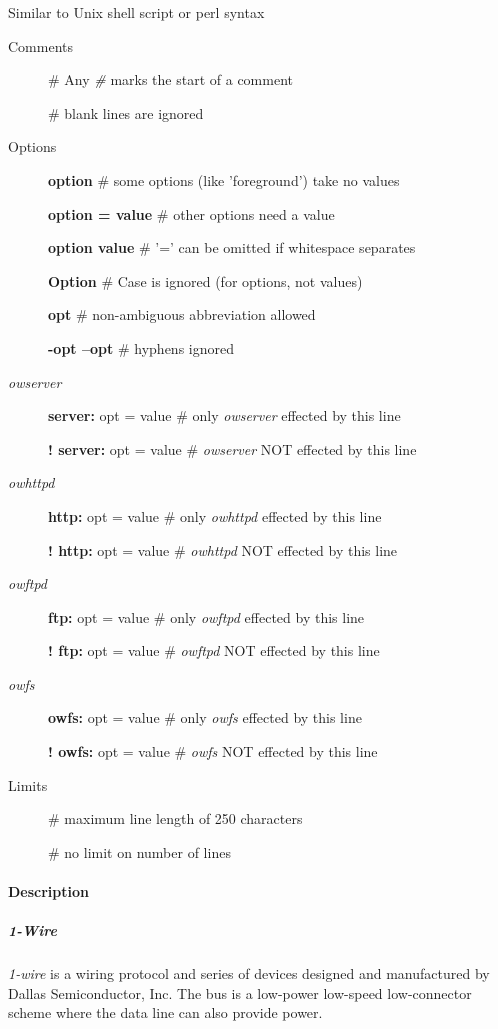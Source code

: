 Similar to Unix shell script or perl
syntax \begin{description}
\item [Comments ] \# Any  \textit{\#} marks the start of a comment 

\# blank lines are ignored  
\item [Options ] \textbf{option } \# some options (like 'foreground')
take no values 

\textbf{option = value } \# other options need a value 

\textbf{option value   } \# '=' can be omitted if whitespace separates 

\textbf{Option} \# Case is ignored (for options, not values) 

\textbf{opt            } \# non-ambiguous abbreviation allowed 

\textbf{-opt --opt     } \# hyphens ignored 
\item [\textit{owserver} ] \textbf{server: } opt = value \# only \textit{owserver}
effected by this line 

\textbf{! server: } opt = value \#  \textit{owserver} NOT effected by this line 
\item [\textit{owhttpd} ] \textbf{http:
} opt = value \# only \textit{owhttpd} effected by this line 

\textbf{! http: } opt = value \#  \textit{owhttpd} NOT effected by this line 
\item [\textit{owftpd} ] \textbf{ftp: }
opt = value \# only \textit{owftpd} effected by this line 

\textbf{! ftp: } opt = value \#  \textit{owftpd} NOT effected by this line 
\item [\textit{owfs} ] \textbf{owfs: } opt
= value \# only \textit{owfs} effected by this line 

\textbf{! owfs: } opt = value \#  \textit{owfs} NOT effected by this line 
\item [Limits ] \# maximum
line length of 250 characters 

\# no limit on number of lines 
\end{description}

\paragraph*{Description}
          
\subparagraph*{1-Wire}\textit{1-wire}  is a wiring
protocol and series of devices designed and manufactured by Dallas Semiconductor,
Inc. The bus is a low-power low-speed low-connector scheme where the data line
can also provide power. 

